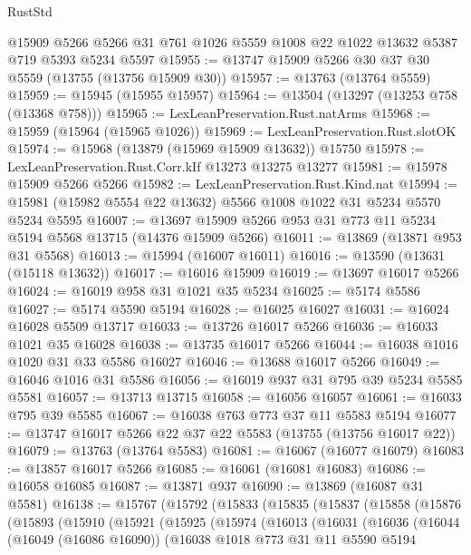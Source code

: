 \begin{lexlean}{RustStd}
\begin{coremodule}
    @15909
    @5266
    @5266
    @31
    @761
    @1026
    @5559
    @1008
    @22
    @1022
    @13632
    @5387
    @719
    @5393
    @5234
    @5597
@15955 := @13747 @15909 @5266 @30 @37 @30 @5559 (@13755 (@13756 @15909 @30))
@15957 := @13763 (@13764 @5559)
@15959 := @15945 (@15955 @15957)
@15964 := @13504 (@13297 (@13253 @758 (@13368 @758)))
@15965 := LexLeanPreservation.Rust.natArms
@15968 := @15959 (@15964 (@15965 @1026))
@15969 := LexLeanPreservation.Rust.slotOK
@15974 := @15968 (@13879 (@15969 @15909 @13632)) @15750
@15978 := LexLeanPreservation.Rust.Corr.kIf @13273 @13275 @13277
@15981 := @15978 @15909 @5266 @5266
@15982 := LexLeanPreservation.Rust.Kind.nat
@15994 := @15981 (@15982 @5554 @22 @13632) @5566 @1008 @1022 @31 @5234 @5570 @5234 @5595
@16007 := @13697 @15909 @5266 @953 @31 @773 @11 @5234 @5194 @5568 @13715 (@14376 @15909 @5266)
@16011 := @13869 (@13871 @953 @31 @5568)
@16013 := @15994 (@16007 @16011)
@16016 := @13590 (@13631 (@15118 @13632))
@16017 := @16016 @15909
@16019 := @13697 @16017 @5266
@16024 := @16019 @958 @31 @1021 @35 @5234
@16025 := @5174 @5586
@16027 := @5174 @5590 @5194
@16028 := @16025 @16027
@16031 := @16024 @16028 @5509 @13717
@16033 := @13726 @16017 @5266
@16036 := @16033 @1021 @35 @16028
@16038 := @13735 @16017 @5266
@16044 := @16038 @1016 @1020 @31 @33 @5586 @16027
@16046 := @13688 @16017 @5266
@16049 := @16046 @1016 @31 @5586
@16056 := @16019 @937 @31 @795 @39 @5234 @5585 @5581
@16057 := @13713 @13715
@16058 := @16056 @16057
@16061 := @16033 @795 @39 @5585
@16067 := @16038 @763 @773 @37 @11 @5583 @5194
@16077 := @13747 @16017 @5266 @22 @37 @22 @5583 (@13755 (@13756 @16017 @22))
@16079 := @13763 (@13764 @5583)
@16081 := @16067 (@16077 @16079)
@16083 := @13857 @16017 @5266
@16085 := @16061 (@16081 @16083)
@16086 := @16058 @16085
@16087 := @13871 @937
@16090 := @13869 (@16087 @31 @5581)
@16138 := @15767
    (@15792
      (@15833
        (@15835
          (@15837
            (@15858
              (@15876
                (@15893
                  (@15910
                    (@15921
                      (@15925
                        (@15974
                          (@16013
                            (@16031
                              (@16036
                                (@16044
                                  (@16049 (@16086 @16090))
                                  (@16038
                                    @1018
                                    @773
                                    @31
                                    @11
                                    @5590
                                    @5194

\end{coremodule}
\end{lexlean}
